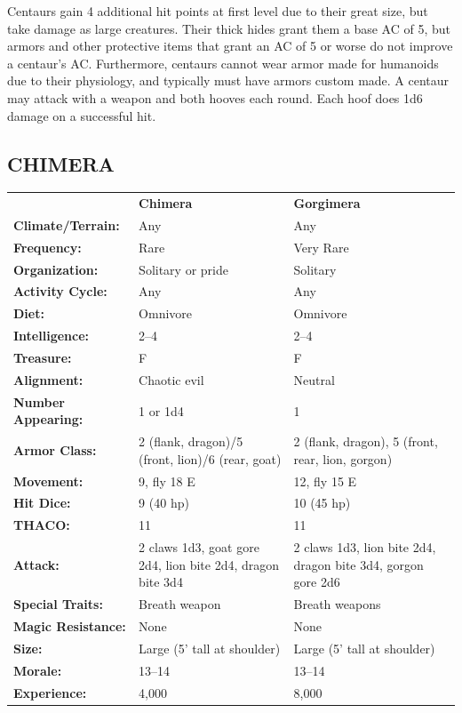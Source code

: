 \begin{multicols}{2}
Centaurs gain 4 additional hit points at first level due to their great size, but take damage as large creatures. Their thick hides grant them a base AC of 5, but armors and other protective items that grant an AC of 5 or worse do not improve a centaur's AC. Furthermore, centaurs cannot wear armor made for humanoids due to their physiology, and typically must have armors custom made. A centaur may attack with a weapon and both hooves each round. Each hoof does 1d6 damage on a successful hit. 

\noindent
\begin{minipage}{\columnwidth}

\vspace{1em}

\subsection{CHIMERA}

\noindent
\begin{tabular}{p{}g{.24\columnwidth}p{.24\columnwidth}}
							& \textbf{Chimera} & \textbf{Gorgimera} \\
\textbf{Climate/Terrain:}	& Any & Any \\
\textbf{Frequency:} 		& Rare & Very Rare \\
\textbf{Organization:} 		& Solitary or pride & Solitary \\
\textbf{Activity Cycle:} 	& Any & Any \\
\textbf{Diet:} 				& Omnivore & Omnivore \\
\textbf{Intelligence:} 		& 2--4 & 2--4 \\
\textbf{Treasure:} 			& F & F \\
\textbf{Alignment:} 		& Chaotic evil & Neutral \\
\hline
\textbf{Number Appearing:} 	& 1 or 1d4 & 1 \\
\textbf{Armor Class:} 		& 2 (flank, dragon)/5 (front, lion)/6 (rear, goat) & 2 (flank, dragon), 5 (front, rear, lion, gorgon) \\
\textbf{Movement:} 			& 9, fly 18 E & 12, fly 15 E \\
\textbf{Hit Dice:} 			& 9 (40 hp) & 10 (45 hp) \\
\textbf{THACO:} 			& 11 & 11 \\
\textbf{Attack:} 			& 2 claws 1d3, goat gore 2d4, lion bite 2d4, dragon bite 3d4 & 2 claws 1d3, lion bite 2d4, dragon bite 3d4, gorgon gore 2d6 \\
\textbf{Special Traits:} & Breath weapon & Breath weapons \\
\textbf{Magic Resistance:} 	& None & None \\
\textbf{Size:} 				& Large (5' tall at shoulder) & Large (5' tall at shoulder) \\
\textbf{Morale:} 			& 13--14 & 13--14 \\
\textbf{Experience:} 		& 4,000 & 8,000 \\ %
\end{tabular}


\end{minipage}
\end{multicols}
